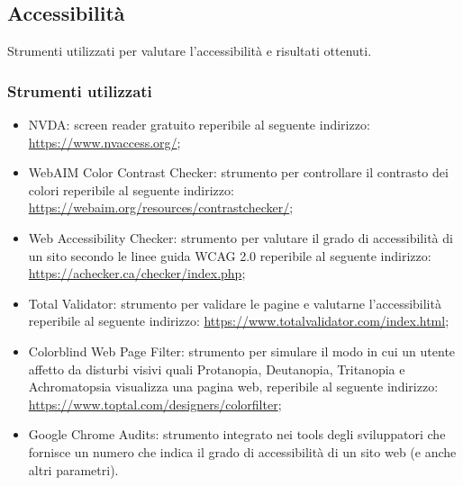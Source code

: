 \documentclass[12pt]{article}
\begin{document}
	\subsection{Accessibilità}
	Strumenti utilizzati per valutare l'accessibilità e risultati ottenuti.
	\subsubsection{Strumenti utilizzati}
		\begin{itemize}
			\item NVDA: screen reader gratuito reperibile al seguente indirizzo: \url{https://www.nvaccess.org/};
			\item WebAIM Color Contrast Checker: strumento per controllare il contrasto dei colori reperibile al seguente indirizzo: \url{https://webaim.org/resources/contrastchecker/};
			\item Web Accessibility Checker: strumento per valutare il grado di accessibilità di un sito secondo le linee guida WCAG 2.0 reperibile al seguente indirizzo: \url{https://achecker.ca/checker/index.php};
			\item Total Validator: strumento per validare le pagine e valutarne l'accessibilità reperibile al seguente indirizzo: \url{https://www.totalvalidator.com/index.html};
			\item Colorblind Web Page Filter: strumento per simulare il modo in cui un utente affetto da disturbi visivi quali Protanopia, Deutanopia, Tritanopia e Achromatopsia visualizza una pagina web, reperibile al seguente indirizzo: \url{https://www.toptal.com/designers/colorfilter};
			\item Google Chrome Audits: strumento integrato nei tools degli sviluppatori che fornisce un numero che indica il grado di accessibilità di un sito web (e anche altri parametri).
		\end{itemize}
\end{document}
